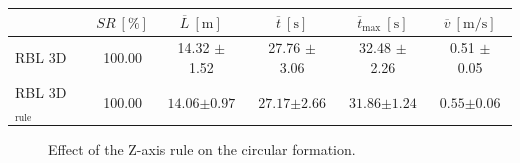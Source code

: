 \begin{itemize}
\begin{table}[H]
                    \centering
                    \renewcommand{\arraystretch}{1.2}
                    \begin{tabular}{|l|c|c|c|c|c|}
                    \hline
                                                & \( SR \ [\%] \) & \( \overline{L} \ [\mathrm{m}] \) & \( \overline{t} \ [\mathrm{s}] \) & \( \overline{t}_{\text{max}} \ [\mathrm{s}] \) & \( \overline{v} \ [\mathrm{m/s}] \)     \\ \hline
                    RBL 3D                      & 100.00          & 14.32 $\pm$ 1.52                  & 27.76 $\pm$ 3.06                  & 32.48 $\pm$ 2.26                               & 0.51 $\pm$ 0.05                         \\ \hline
                    RBL 3D\(_{\text{rule}}\)                & 100.00          & $\mathbf{14.06} \boldsymbol{\pm} \mathbf{0.97}$                  & $\mathbf{27.17} \boldsymbol{\pm} \mathbf{2.66}$                  & $\mathbf{31.86} \boldsymbol{\pm} \mathbf{1.24}$                               & $\mathbf{0.55} \boldsymbol{\pm} \mathbf{0.06}$                         \\ \hline
                    \end{tabular}
                \end{table}
        \end{itemize}

        \begin{figure}[H]
            \centering
            \caption{
                Effect of the Z-axis rule on the circular formation. 
            }
            \label{fig:z_ax_rule_cross}
        \end{figure}

